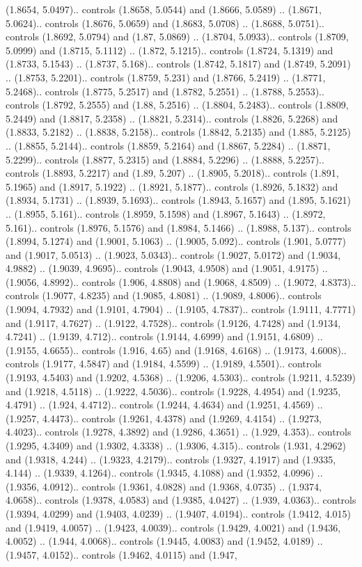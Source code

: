 (1.8654, 5.0497).. controls (1.8658, 5.0544) and (1.8666, 5.0589) .. (1.8671, 5.0624).. controls (1.8676, 5.0659) and (1.8683, 5.0708) .. (1.8688, 5.0751).. controls (1.8692, 5.0794) and (1.87, 5.0869) .. (1.8704, 5.0933).. controls (1.8709, 5.0999) and (1.8715, 5.1112) .. (1.872, 5.1215).. controls (1.8724, 5.1319) and (1.8733, 5.1543) .. (1.8737, 5.168).. controls (1.8742, 5.1817) and (1.8749, 5.2091) .. (1.8753, 5.2201).. controls (1.8759, 5.231) and (1.8766, 5.2419) .. (1.8771, 5.2468).. controls (1.8775, 5.2517) and (1.8782, 5.2551) .. (1.8788, 5.2553).. controls (1.8792, 5.2555) and (1.88, 5.2516) .. (1.8804, 5.2483).. controls (1.8809, 5.2449) and (1.8817, 5.2358) .. (1.8821, 5.2314).. controls (1.8826, 5.2268) and (1.8833, 5.2182) .. (1.8838, 5.2158).. controls (1.8842, 5.2135) and (1.885, 5.2125) .. (1.8855, 5.2144).. controls (1.8859, 5.2164) and (1.8867, 5.2284) .. (1.8871, 5.2299).. controls (1.8877, 5.2315) and (1.8884, 5.2296) .. (1.8888, 5.2257).. controls (1.8893, 5.2217) and (1.89, 5.207) .. (1.8905, 5.2018).. controls (1.891, 5.1965) and (1.8917, 5.1922) .. (1.8921, 5.1877).. controls (1.8926, 5.1832) and (1.8934, 5.1731) .. (1.8939, 5.1693).. controls (1.8943, 5.1657) and (1.895, 5.1621) .. (1.8955, 5.161).. controls (1.8959, 5.1598) and (1.8967, 5.1643) .. (1.8972, 5.161).. controls (1.8976, 5.1576) and (1.8984, 5.1466) .. (1.8988, 5.137).. controls (1.8994, 5.1274) and (1.9001, 5.1063) .. (1.9005, 5.092).. controls (1.901, 5.0777) and (1.9017, 5.0513) .. (1.9023, 5.0343).. controls (1.9027, 5.0172) and (1.9034, 4.9882) .. (1.9039, 4.9695).. controls (1.9043, 4.9508) and (1.9051, 4.9175) .. (1.9056, 4.8992).. controls (1.906, 4.8808) and (1.9068, 4.8509) .. (1.9072, 4.8373).. controls (1.9077, 4.8235) and (1.9085, 4.8081) .. (1.9089, 4.8006).. controls (1.9094, 4.7932) and (1.9101, 4.7904) .. (1.9105, 4.7837).. controls (1.9111, 4.7771) and (1.9117, 4.7627) .. (1.9122, 4.7528).. controls (1.9126, 4.7428) and (1.9134, 4.7241) .. (1.9139, 4.712).. controls (1.9144, 4.6999) and (1.9151, 4.6809) .. (1.9155, 4.6655).. controls (1.916, 4.65) and (1.9168, 4.6168) .. (1.9173, 4.6008).. controls (1.9177, 4.5847) and (1.9184, 4.5599) .. (1.9189, 4.5501).. controls (1.9193, 4.5403) and (1.9202, 4.5368) .. (1.9206, 4.5303).. controls (1.9211, 4.5239) and (1.9218, 4.5118) .. (1.9222, 4.5036).. controls (1.9228, 4.4954) and (1.9235, 4.4791) .. (1.924, 4.4712).. controls (1.9244, 4.4634) and (1.9251, 4.4569) .. (1.9257, 4.4473).. controls (1.9261, 4.4378) and (1.9269, 4.4154) .. (1.9273, 4.4023).. controls (1.9278, 4.3892) and (1.9286, 4.3651) .. (1.929, 4.353).. controls (1.9295, 4.3409) and (1.9302, 4.3338) .. (1.9306, 4.315).. controls (1.931, 4.2962) and (1.9318, 4.244) .. (1.9323, 4.2179).. controls (1.9327, 4.1917) and (1.9335, 4.144) .. (1.9339, 4.1264).. controls (1.9345, 4.1088) and (1.9352, 4.0996) .. (1.9356, 4.0912).. controls (1.9361, 4.0828) and (1.9368, 4.0735) .. (1.9374, 4.0658).. controls (1.9378, 4.0583) and (1.9385, 4.0427) .. (1.939, 4.0363).. controls (1.9394, 4.0299) and (1.9403, 4.0239) .. (1.9407, 4.0194).. controls (1.9412, 4.015) and (1.9419, 4.0057) .. (1.9423, 4.0039).. controls (1.9429, 4.0021) and (1.9436, 4.0052) .. (1.944, 4.0068).. controls (1.9445, 4.0083) and (1.9452, 4.0189) .. (1.9457, 4.0152).. controls (1.9462, 4.0115) and (1.947, 